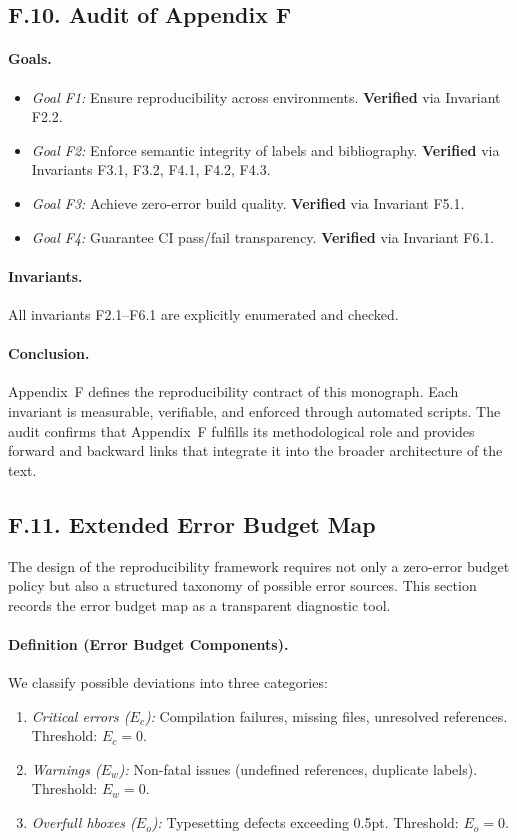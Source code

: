 \subsection*{F.10. Audit of Appendix F}

\paragraph{Goals.}
\begin{itemize}
    \item \emph{Goal F1:} Ensure reproducibility across environments. \textbf{Verified} via Invariant F2.2.
    \item \emph{Goal F2:} Enforce semantic integrity of labels and bibliography. \textbf{Verified} via Invariants F3.1, F3.2, F4.1, F4.2, F4.3.
    \item \emph{Goal F3:} Achieve zero-error build quality. \textbf{Verified} via Invariant F5.1.
    \item \emph{Goal F4:} Guarantee CI pass/fail transparency. \textbf{Verified} via Invariant F6.1.
\end{itemize}

\paragraph{Invariants.} All invariants F2.1–F6.1 are explicitly enumerated and checked.

\paragraph{Conclusion.} Appendix~F defines the reproducibility contract of this monograph. Each invariant is measurable, verifiable, and enforced through automated scripts. The audit confirms that Appendix~F fulfills its methodological role and provides forward and backward links that integrate it into the broader architecture of the text.

\subsection*{F.11. Extended Error Budget Map}

The design of the reproducibility framework requires not only a zero-error budget policy but also a structured taxonomy of possible error sources. This section records the error budget map as a transparent diagnostic tool.

\paragraph{Definition (Error Budget Components).} We classify possible deviations into three categories:
\begin{enumerate}
    \item \emph{Critical errors ($E_c$):} Compilation failures, missing files, unresolved references. Threshold: $E_c=0$.
    \item \emph{Warnings ($E_w$):} Non-fatal issues (undefined references, duplicate labels). Threshold: $E_w=0$.
    \item \emph{Overfull hboxes ($E_o$):} Typesetting defects exceeding 0.5pt. Threshold: $E_o=0$.
\end{enumerate}

